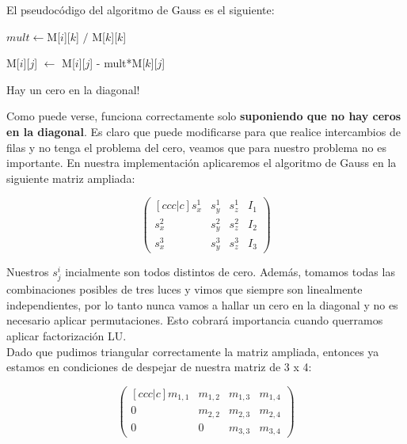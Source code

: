 El pseudocódigo del algoritmo de Gauss es el siguiente:

\begin{algorithm}[H]
\begin{algorithmic}


                \State $mult \gets $M[$i$][$k$] $/$ M[$k$][$k$]

                    \State M[$i$][$j$] $\gets$ M[$i$][$j$] - mult*M[$k$][$j$]

                \EndFor
            \Else
                \State Hay un cero en la diagonal!
            \EndIf
        \EndFor
    \EndFor

\EndFunction
\end{algorithmic}
\end{algorithm}

Como puede verse, funciona correctamente solo \textbf{suponiendo que no hay ceros en la diagonal}. Es claro que puede modificarse para que realice intercambios de filas y no tenga el problema del cero, veamos que para nuestro problema no es importante. En nuestra implementación aplicaremos el algoritmo de Gauss en la siguiente matriz ampliada:

\[
\begin{pmatrix}[ccc|c]
    s_{x}^{1} & s_{y}^{1} & s_{z}^{1} & I_{1} \\
    s_{x}^{2} & s_{y}^{2} & s_{z}^{2} & I_{2} \\
    s_{x}^{3} & s_{y}^{3} & s_{z}^{3} & I_{3}
\end{pmatrix}
\]

Nuestros $s_{j}^{i}$ incialmente son todos distintos de cero. Además, tomamos todas las combinaciones posibles de tres luces y vimos que siempre son linealmente independientes, por lo tanto nunca vamos a hallar un cero en la diagonal y no es necesario aplicar permutaciones. Esto cobrará importancia cuando querramos aplicar factorización LU. \\

Dado que pudimos triangular correctamente la matriz ampliada, entonces ya estamos en condiciones de despejar de nuestra matriz de 3 x 4:

\[
\begin{pmatrix}[ccc|c]
    m_{1,1}   & m_{1,2} & m_{1,3} & m_{1, 4} \\
    0         & m_{2,2} & m_{2,3} & m_{2, 4} \\
    0         & 0       & m_{3,3} & m_{3, 4}
\end{pmatrix}
\]

